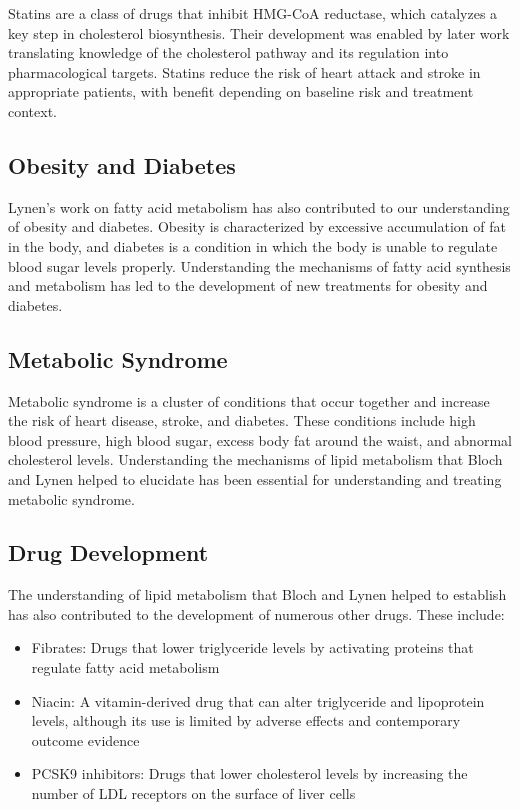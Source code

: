 Statins are a class of drugs that inhibit HMG-CoA reductase, which catalyzes a key step in cholesterol biosynthesis. Their development was enabled by later work translating knowledge of the cholesterol pathway and its regulation into pharmacological targets. Statins reduce the risk of heart attack and stroke in appropriate patients, with benefit depending on baseline risk and treatment context.

\subsection{Obesity and Diabetes}

Lynen's work on fatty acid metabolism has also contributed to our understanding of obesity and diabetes. Obesity is characterized by excessive accumulation of fat in the body, and diabetes is a condition in which the body is unable to regulate blood sugar levels properly. Understanding the mechanisms of fatty acid synthesis and metabolism has led to the development of new treatments for obesity and diabetes.

\subsection{Metabolic Syndrome}

Metabolic syndrome is a cluster of conditions that occur together and increase the risk of heart disease, stroke, and diabetes. These conditions include high blood pressure, high blood sugar, excess body fat around the waist, and abnormal cholesterol levels. Understanding the mechanisms of lipid metabolism that Bloch and Lynen helped to elucidate has been essential for understanding and treating metabolic syndrome.

\subsection{Drug Development}

The understanding of lipid metabolism that Bloch and Lynen helped to establish has also contributed to the development of numerous other drugs. These include:

\begin{itemize}
\item Fibrates: Drugs that lower triglyceride levels by activating proteins that regulate fatty acid metabolism
\item Niacin: A vitamin-derived drug that can alter triglyceride and lipoprotein levels, although its use is limited by adverse effects and contemporary outcome evidence
\item PCSK9 inhibitors: Drugs that lower cholesterol levels by increasing the number of LDL receptors on the surface of liver cells
\end{itemize}

